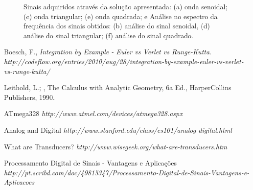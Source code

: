 \documentclass[12pt,a4paper]{report}
\begin{document}
\begin{figure}[ht!]
\begin{center}
{        }
    \end{center}
    \caption{
     	Sinais adquiridos através da solução apresentada: (a) onda senoidal; (c) onda triangular; (e) onda quadrada; e Análise no espectro da frequência dos sinais obtidos: (b) análise do sinal senoidal, (d) análise do sinal triangular; (f) análise do sinal quadrado.
     }
   \label{fig:resultados}
\end{figure}

\begin{thebibliography}{9}

  Boesch, F.,
  \emph{Integration by Example - Euler vs Verlet vs Runge-Kutta}.
  \textit{http://codeflow.org/entries/2010/aug/28/integration-by-example-euler-vs-verlet-vs-runge-kutta/}
  
  Leithold, L.; , The Calculus with Analytic Geometry, 6a Ed., HarperCollins Publishers, 1990.

	ATmega328 \textit{http://www.atmel.com/devices/atmega328.aspx}
	
	Analog and Digital \textit{http://www.stanford.edu/class/cs101/analog-digital.html}
	
	What are Transducers? \textit{http://www.wisegeek.org/what-are-transducers.htm}
	

	Processamento Digital de Sinais - Vantagens e Aplicações \textit{http://pt.scribd.com/doc/49815347/Processamento-Digital-de-Sinais-Vantagens-e-Aplicacoes}
	
\end{thebibliography}
\end{document}
